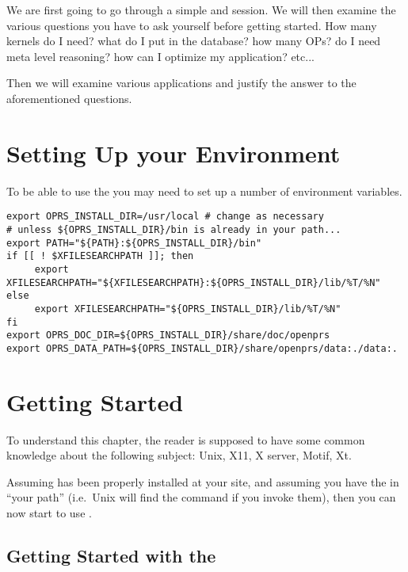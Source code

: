 We are first going to go through a simple \OPE{} and \XPK{} session. We
will then  examine the various questions you have to ask
yourself before getting started. How many kernels do I need? what do I
put in the database? how many OPs? do I need meta level reasoning? how
can I optimize my application? etc...

Then we will examine various applications and justify the answer to the
aforementioned questions.

\chapter{Setting Up your Environment}

To be able to use the \COPRSDE{} you may need to set up a number of environment
variables.

\begin{verbatim}
export OPRS_INSTALL_DIR=/usr/local # change as necessary
# unless ${OPRS_INSTALL_DIR}/bin is already in your path...
export PATH="${PATH}:${OPRS_INSTALL_DIR}/bin"
if [[ ! $XFILESEARCHPATH ]]; then
     export XFILESEARCHPATH="${XFILESEARCHPATH}:${OPRS_INSTALL_DIR}/lib/%T/%N"
else
     export XFILESEARCHPATH="${OPRS_INSTALL_DIR}/lib/%T/%N"
fi
export OPRS_DOC_DIR=${OPRS_INSTALL_DIR}/share/doc/openprs
export OPRS_DATA_PATH=${OPRS_INSTALL_DIR}/share/openprs/data:./data:.
\end{verbatim}


\chapter{Getting Started}

To understand this chapter, the reader is supposed to have some common
knowledge about the following subject: Unix, X11, X server, Motif, Xt. 

Assuming \COPRSDE{} has been properly installed at your site, and assuming
you have the \COPRSDE{} in ``your path'' (i.e.\ Unix will find the command
if you invoke them), then you can now start to use \COPRS{}.



\section{Getting Started with the \OPE{}}

